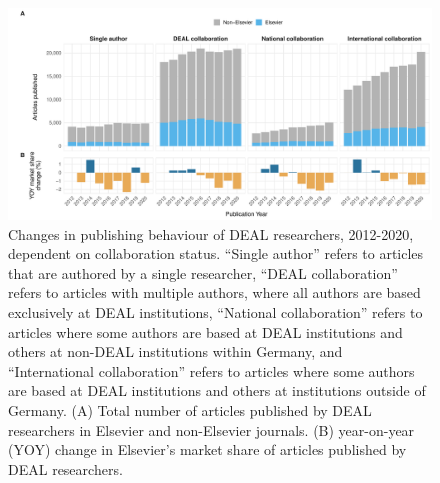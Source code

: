 \documentclass[
]{article}
\begin{document}
\begin{figure}

{\centering \includegraphics{analysis_files/figure-latex/items-publisher-year-collaboration-1} 

}

\caption{Changes in publishing behaviour of DEAL researchers, 2012-2020, dependent on collaboration status. ``Single author'' refers to articles that are authored by a single researcher, ``DEAL collaboration'' refers to articles with multiple authors, where all authors are based exclusively at DEAL institutions, ``National collaboration'' refers to articles where some authors are based at DEAL institutions and others at non-DEAL institutions within Germany, and ``International collaboration'' refers to articles where some authors are based at DEAL institutions and others at institutions outside of Germany. (A) Total number of articles published by DEAL researchers in Elsevier and non-Elsevier journals. (B) year-on-year (YOY) change in Elsevier's market share of articles published by DEAL researchers.}\label{fig:items-publisher-year-collaboration}
\end{figure}
\end{document}
